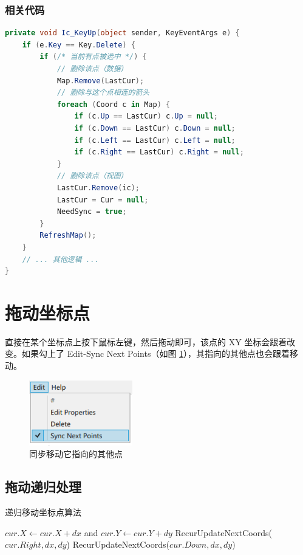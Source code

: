 \subsubsection{相关代码}

\begin{lstlisting}[language=cs]
private void Ic_KeyUp(object sender, KeyEventArgs e) {
    if (e.Key == Key.Delete) {
        if (/* 当前有点被选中 */) {
            // 删除该点（数据)
            Map.Remove(LastCur);
            // 删除与这个点相连的箭头
            foreach (Coord c in Map) {
                if (c.Up == LastCur) c.Up = null;
                if (c.Down == LastCur) c.Down = null;
                if (c.Left == LastCur) c.Left = null;
                if (c.Right == LastCur) c.Right = null;
            }
            // 删除该点（视图)
            LastCur.Remove(ic);
            LastCur = Cur = null;
            NeedSync = true;
        }
        RefreshMap();
    }
    // ... 其他逻辑 ...
}
\end{lstlisting}

\section{拖动坐标点}

直接在某个坐标点上按下鼠标左键，然后拖动即可，该点的 XY 坐标会跟着改变。如果勾上了 Edit-Sync Next Points（如图 \ref{fig:sync}），其指向的其他点也会跟着移动。

\begin{figure}[H]
  \centering
  \includegraphics[width=0.4\textwidth]{assets/sync.png}
  \caption{同步移动它指向的其他点}
  \label{fig:sync}
\end{figure}

\subsection{拖动递归处理}

\begin{algorithm}[H]
  \caption{递归移动坐标点算法}
  \begin{algorithmic}[1]
    \State $cur.X \gets cur.X + dx$ and $cur.Y \gets cur.Y + dy$
      \State RecurUpdateNextCoords($cur.Right, dx, dy$)
    \EndIf
      \State RecurUpdateNextCoords($cur.Down, dx, dy$)
    \EndIf
    \EndProcedure
  \end{algorithmic}
\end{algorithm}

